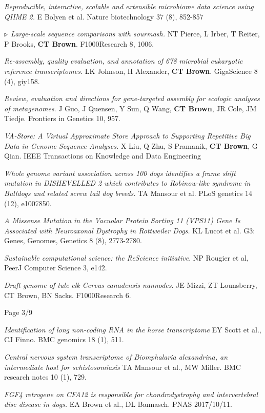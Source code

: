 \documentclass[margin,line]{resume}
\begin{document}
\begin{resume}
{\em Reproducible, interactive, scalable and extensible microbiome data science using QIIME 2.} E Bolyen et al.
Nature biotechnology 37 (8), 852-857

{\color{red} ${\bf \triangleright}$}
{\em Large-scale sequence comparisons with sourmash.} NT Pierce, L Irber, T Reiter, P Brooks, {\bf CT Brown}. F1000Research 8, 1006.

{\em Re-assembly, quality evaluation, and annotation of 678 microbial eukaryotic reference transcriptomes.} LK Johnson, H Alexander, {\bf CT Brown}. GigaScience 8 (4), giy158.

{\em Review, evaluation and directions for gene-targeted assembly for ecologic analyses of metagenomes}. J Guo, J Quensen, Y Sun, Q Wang, {\bf CT Brown}, JR Cole, JM Tiedje. Frontiers in Genetics 10, 957.

{\em VA-Store: A Virtual Approximate Store Approach to Supporting
  Repetitive Big Data in Genome Sequence Analyses.} X Liu, Q Zhu, S
Pramanik, {\bf CT Brown}, G Qian.  IEEE Transactions on Knowledge and Data
Engineering

{\em Whole genome variant association across 100 dogs identifies a frame shift mutation in DISHEVELLED 2 which contributes to Robinow-like syndrome in Bulldogs and related screw tail dog breeds.} TA Mansour et al.
PLoS genetics 14 (12), e1007850.

{\em A Missense Mutation in the Vacuolar Protein Sorting 11 (VPS11) Gene Is Associated with Neuroaxonal Dystrophy in Rottweiler Dogs.} KL Lucot et al.
G3: Genes, Genomes, Genetics 8 (8), 2773-2780.

{\em Sustainable computational science: the ReScience initiative}. NP Rougier et al, PeerJ Computer Science 3, e142.

{\em Draft genome of tule elk Cervus canadensis nannodes}. JE Mizzi, ZT Lounsberry, CT Brown, BN Sacks. F1000Research 6.

\vspace{2cm}
{\centerline {Page 3/9}}

\newpage

{\em Identification of long non-coding RNA in the horse transcriptome} EY Scott et al., CJ Finno. BMC genomics 18 (1), 511.

{\em Central nervous system transcriptome of Biomphalaria alexandrina, an intermediate host for schistosomiasis} TA Mansour et al., MW Miller. BMC research notes 10 (1), 729.

{\em FGF4 retrogene on CFA12 is responsible for chondrodystrophy and intervertebral disc disease in dogs.} EA Brown et al., DL Bannasch. PNAS 2017/10/11.


\end{resume}
\end{document}
